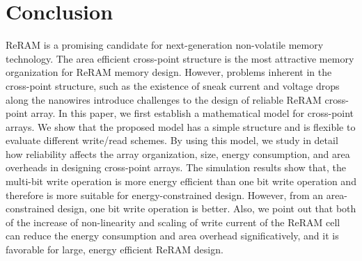\section{Conclusion}\label{sec:conclusion}

ReRAM is a promising candidate for next-generation non-volatile memory
technology. The area efficient cross-point structure is the most
attractive memory organization for ReRAM memory design. However, problems
inherent in the cross-point structure, such as the existence of sneak
current and voltage drops along the nanowires introduce challenges to the
design of reliable ReRAM cross-point array. In this paper, we first
establish a mathematical model for cross-point arrays. We show that the
proposed model has a simple structure and is flexible to evaluate
different write/read schemes. By using this model, we study in detail how
reliability affects the array organization, size, energy consumption, and
area overheads in designing cross-point arrays. The simulation results
show that, the multi-bit write operation is more energy efficient than one
bit write operation and therefore is more suitable for energy-constrained
design. However, from an area-constrained design, one bit write operation
is better. Also, we point out that both of the increase of non-linearity
and scaling of write current of the ReRAM cell can reduce the energy
consumption and area overhead significatively, and it is favorable for
large, energy efficient ReRAM design.
